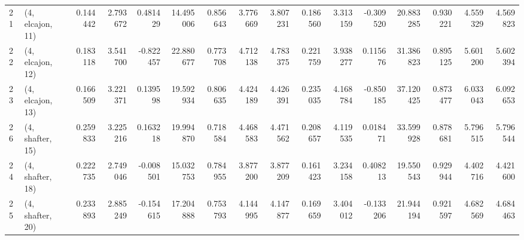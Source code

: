 \begin{tabular}{llrrrrrrrrrrrrrr}
21 &  (4, elcajon, 11) &   0.144442 &  2.793672 &  0.481429 &  14.495006 &  0.856643 &   3.776669 &  3.807231 &  0.186560 &  3.313159 & -0.309520 &   20.883285 &  0.930221 &   4.559329 &   4.569823 \\
22 &  (4, elcajon, 12) &   0.183118 &  3.541700 & -0.822457 &  22.880677 &  0.773708 &   4.712138 &  4.783375 &  0.221759 &  3.938277 &  0.115676 &   31.386823 &  0.895125 &   5.601200 &   5.602394 \\
23 &  (4, elcajon, 13) &   0.166509 &  3.221371 &  0.139598 &  19.592934 &  0.806635 &   4.424189 &  4.426391 &  0.235035 &  4.168784 & -0.850185 &   37.120425 &  0.873477 &   6.033043 &   6.092653 \\
26 &  (4, shafter, 15) &   0.259833 &  3.225216 &  0.163218 &  19.994870 &  0.718584 &   4.468583 &  4.471562 &  0.208657 &  4.119535 &  0.018471 &   33.599928 &  0.878681 &   5.796515 &   5.796544 \\
24 &  (4, shafter, 18) &   0.222735 &  2.749046 & -0.008501 &  15.032753 &  0.784955 &   3.877200 &  3.877209 &  0.161423 &  3.234158 &  0.408213 &   19.550543 &  0.929944 &   4.402716 &   4.421600 \\
25 &  (4, shafter, 20) &   0.233893 &  2.885249 & -0.154615 &  17.204888 &  0.753793 &   4.144995 &  4.147877 &  0.169659 &  3.404012 & -0.133206 &   21.944194 &  0.921597 &   4.682569 &   4.684463 \\
\bottomrule
\end{tabular}
